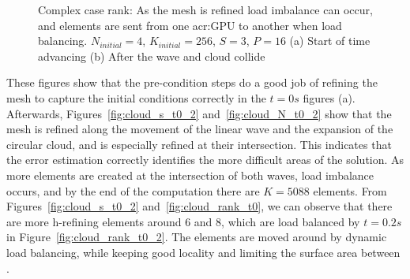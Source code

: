 \begin{figure}[H]
    \centering
    \hfill
    \caption{Complex case rank: As the mesh is refined load imbalance can occur, and elements are
        sent from one \acrshort{acr:GPU} to another when load balancing. \(N_{initial} = 4\),
        \(K_{initial} = 256\), \(S = 3\), \(P = 16\) (a) Start of time advancing (b) After the wave 
        and cloud collide}\label{fig:cloud_rank}
\end{figure}

These figures show that the pre-condition steps do a good job of refining the mesh to capture the
initial conditions correctly in the \(t = 0 s\) figures (a). Afterwards,
Figures~\ref{fig:cloud_s_t0_2} and~\ref{fig:cloud_N_t0_2} show that the mesh is refined along the
movement of the linear wave and the expansion of the circular cloud, and is especially refined at
their intersection. This indicates that the error estimation correctly identifies the more difficult
areas of the solution. As more elements are created at the intersection of both waves, load
imbalance occurs, and by the end of the computation there are \(K = 5088\) elements. From
Figures~\ref{fig:cloud_s_t0_2} and~\ref{fig:cloud_rank_t0}, we can observe that there are more
h-refining elements around  \(6\) and \(8\), which are load balanced by \(t =
0.2 s\) in Figure~\ref{fig:cloud_rank_t0_2}. The elements are moved around by dynamic load
balancing, while keeping good locality and limiting the surface area between .

